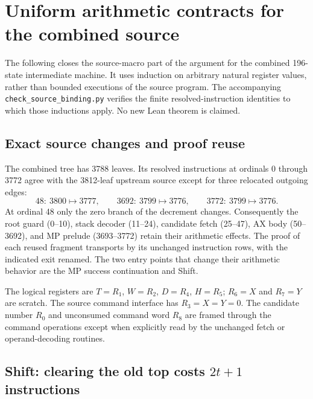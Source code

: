 \section{Uniform arithmetic contracts for the combined source}
\label{sec:combined-source-macros}

The following closes the source-macro part of the argument for the combined
196-state intermediate machine.  It uses induction on arbitrary natural
register values, rather than bounded executions of the source program.
The accompanying \texttt{check\_source\_binding.py} verifies the finite
resolved-instruction identities to which those inductions apply.
No new Lean theorem is claimed.

\subsection{Exact source changes and proof reuse}

The combined tree has 3788 leaves.  Its resolved instructions at ordinals
0 through 3772 agree with the 3812-leaf upstream source except for three
relocated outgoing edges:
\[
 48:\ 3800\mapsto3777,\qquad
 3692:\ 3799\mapsto3776,\qquad
 3772:\ 3799\mapsto3776.
\]
At ordinal 48 only the zero branch of the decrement changes.  Consequently
the root guard (0--10), stack decoder (11--24), candidate fetch (25--47),
AX body (50--3692), and MP prelude (3693--3772) retain their arithmetic
effects.  The proof of each reused fragment transports by its unchanged
instruction rows, with the indicated exit renamed.  The two entry points
that change their arithmetic behavior are the MP success continuation and
Shift.

The logical registers are $T=R_1$, $W=R_2$, $D=R_4$, $H=R_5$; $R_6=X$
and $R_7=Y$ are scratch.  The source command interface has $R_3=X=Y=0$.
The candidate number $R_0$ and unconsumed command word $R_8$ are framed
through the command operations except when explicitly read by the unchanged
fetch or operand-decoding routines.

\subsection{Shift: clearing the old top costs \texorpdfstring{$2t+1$}{2t+1} instructions}

